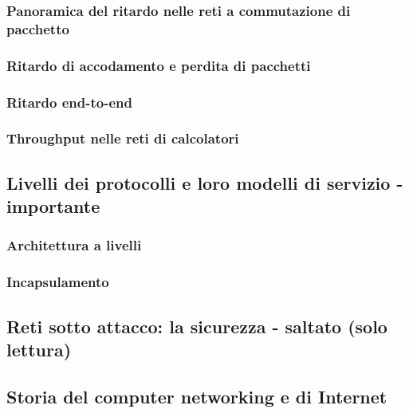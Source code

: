 \subsubsection{Panoramica del ritardo nelle reti a commutazione di pacchetto}
\subsubsection{Ritardo di accodamento e perdita di pacchetti}
\subsubsection{Ritardo end-to-end} 
\subsubsection{Throughput nelle reti di calcolatori} 

\subsection{Livelli dei protocolli e loro modelli di servizio - importante} 
\subsubsection{Architettura a livelli }
\subsubsection{Incapsulamento}

\subsection{Reti sotto attacco: la sicurezza - saltato (solo lettura)}

\subsection{Storia del computer networking e di Internet}
